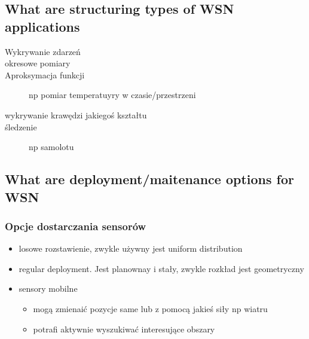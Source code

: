 \subsection{What are structuring types of WSN applications}


\begin{description}
\item[Wykrywanie zdarzeń] 
\item[okresowe pomiary]
\item[Aproksymacja funkcji] np pomiar temperatuyry w czasie/przestrzeni
\item[wykrywanie krawędzi jakiegoś kształtu]
\item[śledzenie]  np samolotu
\end{description}
\subsection{What are deployment/maitenance options for WSN}
\subsubsection{Opcje dostarczania sensorów}
\begin{itemize}
\item losowe rozstawienie, zwykle używny jest uniform distribution
\item regular deployment. Jest planownay i stały, zwykle rozkład jest geometryczny
\item sensory mobilne
\begin{itemize}
\item mogą zmienaić pozycje same lub z pomocą jakieś siły np wiatru
\item potrafi aktywnie wyszukiwać interesujące obszary
\end{itemize}

\end{itemize}
